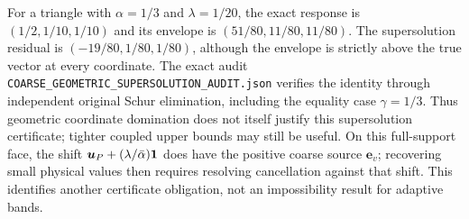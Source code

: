For a triangle with $\alpha=1/3$ and $\lambda=1/20$, the exact response
is $(1/2,1/10,1/10)$ and its envelope is $(51/80,11/80,11/80)$.
The supersolution residual is $(-19/80,1/80,1/80)$, although the envelope
is strictly above the true vector at every coordinate. The exact audit
\nolinkurl{COARSE_GEOMETRIC_SUPERSOLUTION_AUDIT.json} verifies the identity
through independent original Schur elimination, including the equality
case $\gamma=1/3$. Thus geometric coordinate domination does not itself
justify this supersolution certificate; tighter coupled upper bounds may
still be useful. On this full-support face,
the shift $\bm u_P+(\lambda/\bar\alpha)\mathbf{1}$ does have the positive
coarse source $\bm e_v$; recovering small physical values then requires
resolving cancellation against that shift. This identifies another
certificate obligation, not an impossibility result for adaptive bands.
